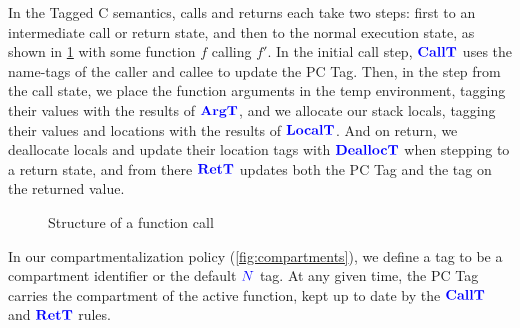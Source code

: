 \documentclass{llncs}
\begin{document}
In the Tagged C semantics, calls and returns each take two steps: first to an intermediate call
or return state, and
then to the normal execution state, as shown in \cref{fig:functions} with some function \(f\)
calling \(f'\). In the initial call step, \(\color{blue} \mathbf{CallT}\)
uses the name-tags of the caller and callee to update the PC Tag. Then, in the step from the call
state, we place the function arguments in the temp environment, tagging their values with
the results of \(\color{blue} \mathbf{ArgT}\), and we allocate our stack locals, tagging their values and locations
with the results of \(\color{blue} \mathbf{LocalT}\). And on return, we deallocate locals and update their location
tags with \(\color{blue} \mathbf{DeallocT}\) when stepping to a return state, and from there \(\color{blue} \mathbf{RetT}\) updates both
the PC Tag and the tag on the returned value.

\begin{figure}

  \caption{Structure of a function call}
  \label{fig:functions}
\end{figure}

In our compartmentalization policy (\cref{fig:compartments}), we define a tag to be a compartment
identifier or the default \({\color{blue} N}\) tag. At any given time, the PC Tag carries the compartment of the
active function, kept up to date by the \(\color{blue} \mathbf{CallT}\) and \(\color{blue} \mathbf{RetT}\) rules.
\end{document}
